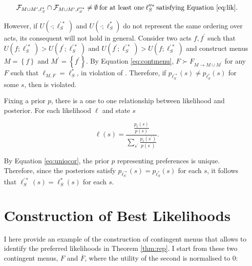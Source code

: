 \begin{corproof}
	\[ \mathcal{F}_{M \cup M^{\prime}, \ell_S^{*}} \cap \mathcal{F}_{M \cup M^{\prime}, \ell^{ \prime \prime *}_{S}} \neq \emptyset \: \text{for at least one} \: \ell_{S}^{\prime \prime *} \: \text{satisfying Equation \eqref{eq:lik}} .
	\]

	However, if \( U \left( \cdot; \ell_{S}^{\prime *} \right) \) and \( U \left( \cdot; \ell^{*}_S \right) \) do not represent the same ordering over acts, its consequent will not hold in general. Consider two acts \( f, f^{\prime} \) such that \( U \left( f ; \ell_{S}^{\prime *} \right) > U \left( f^{\prime} ; \ell_{S}^{\prime *} \right) \) and \( U \left(f^{\prime} ; \ell_S^{\prime *} \right) > U \left(f ; \ell_S^{\prime *} \right) \) and construct menus \( M = \left\{ f \right\} \) and \( M^{\prime} = \left\{ f^{\prime} \right\} \). By Equation \eqref{eq:contmenu}, \( F \succ F_{M \rightarrow M \cup M^{\prime}} \) for any \( F \) such that \( \ell_{M,F} = \ell_{S}^{*} \), in violation of . Therefore, if \( p_{\ell_{S}^{\prime *}} \left( s \right) \neq p_{\ell_{S}^{*}} \left( s \right) \) for some \( s \), then  is violated.

	Fixing a prior \( p \), there is a one to one relationship between likelihood and posterior. For each likelihood \( \ell \) and state \( s \)

	\[
		\ell \left( s \right) = \frac{\frac{p_{\ell} \left( s \right) }{p \left( s \right)}}{ \sum_{s^{\prime}} \frac{p_{\ell} \left( s^{\prime} \right) }{p \left( s^{\prime} \right)}} .
	\]

	By Equation \eqref{eq:uniqcor}, the prior \( p \) representing preferences is unique. Therefore, since the posteriors satisfy \( p_{\ell_{S}^{\prime *}} \left( s \right) = p_{\ell_{S}^{*}} \left( s \right) \) for each \( s \), it follows that \( \ell_{S}^{ \prime*} \left( s \right) = \ell_{S}^{*} \left( s \right) \) for each \( s \).

\end{corproof}


\section{Construction of Best Likelihoods}\label{app:bestl}

I here provide an example of the construction of contingent menus that allows to identify the preferred likelihoods in Theorem \ref{thm:rep}. I start from these two contingent menus, \( F \) and \( \overline{F} \), where the utility of the second is normalised to \( 0 \):

